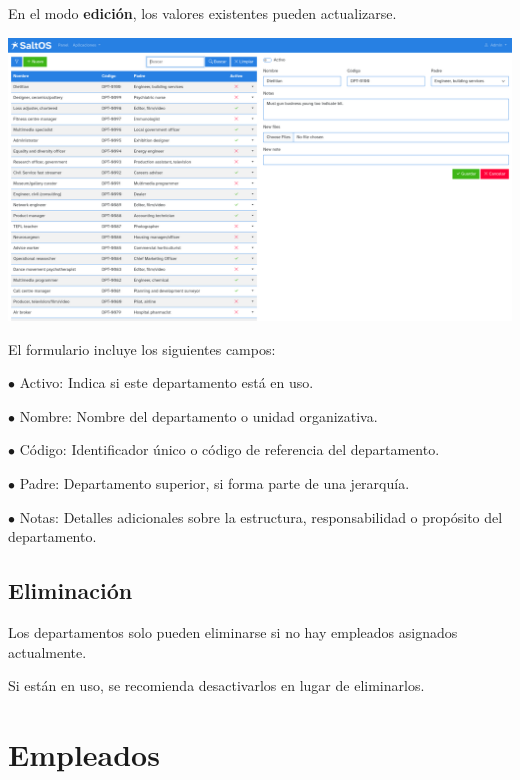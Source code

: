 \documentclass[a4paper]{article}
\begin{document}
En el modo \textbf{edición}, los valores existentes pueden actualizarse.

\begin{center}\includegraphics[width=1\textwidth]{../ujest/snaps/test-screenshots-js-screenshots-hr-departments-edit-100-es-es-1-snap.png}\end{center}

El formulario incluye los siguientes campos:

\begin{compactitem}
\item[\color{myblue}$\bullet$] Activo: Indica si este departamento está en uso.
\item[\color{myblue}$\bullet$] Nombre: Nombre del departamento o unidad organizativa.
\item[\color{myblue}$\bullet$] Código: Identificador único o código de referencia del departamento.
\item[\color{myblue}$\bullet$] Padre: Departamento superior, si forma parte de una jerarquía.
\item[\color{myblue}$\bullet$] Notas: Detalles adicionales sobre la estructura, responsabilidad o propósito del departamento.
\end{compactitem}

\hypertarget{toc105}{}
\subsection{Eliminación}

Los departamentos solo pueden eliminarse si no hay empleados asignados actualmente.

Si están en uso, se recomienda desactivarlos en lugar de eliminarlos.


\hypertarget{toc106}{}
\section{Empleados}
\end{document}
